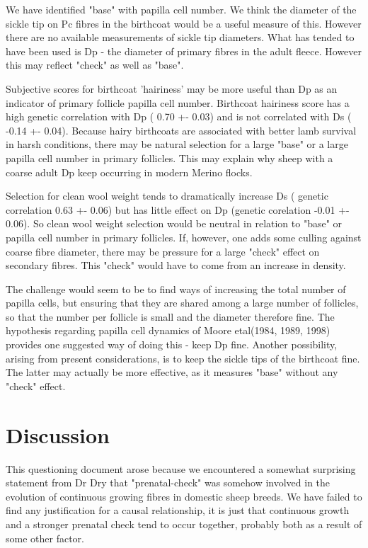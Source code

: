 \documentclass[titlepage]{article}  %
\begin{document}
We have identified "base" with papilla cell number. We think the diameter of the sickle tip on Pc fibres in the birthcoat would be a useful measure of this. However there are no available measurements of sickle tip diameters. What has tended to have been used is Dp - the diameter of primary fibres in the adult fleece. However this may reflect "check" as well as "base". 

Subjective scores for birthcoat 'hairiness' may be more useful than Dp as an indicator of primary follicle papilla cell number. Birthcoat hairiness score has a high genetic correlation with Dp ( 0.70 +- 0.03) and is not correlated with Ds ( -0.14 +- 0.04).  Because hairy birthcoats are associated with better lamb survival in harsh conditions, there may be natural selection for a large "base" or a large papilla cell number in primary follicles. This may explain why sheep with a coarse adult Dp keep occurring in modern Merino flocks.

Selection for clean wool weight tends to dramatically increase Ds ( genetic correlation 0.63 +- 0.06) but has little effect on Dp (genetic corelation -0.01 +- 0.06).  So clean wool weight selection would be neutral in relation to "base" or papilla cell number in primary follicles. If, however, one adds some culling against coarse fibre diameter, there may be pressure for a large "check" effect on secondary fibres. This "check" would have to come from an increase in density.

The challenge would seem to be to find ways of increasing the total number of papilla cells, but ensuring that they are shared among a large number of follicles, so that the number per follicle is small and the diameter therefore fine. The hypothesis regarding papilla cell dynamics of Moore etal(1984, 1989, 1998)~\cite{moor:84}~\cite{moor:89}~\cite{moor:98} provides one suggested way of doing this - keep Dp fine. Another possibility, arising from present considerations, is to keep the sickle tips of the birthcoat fine. The latter may actually be more effective, as it measures "base" without any "check" effect.

\section{Discussion}
This questioning document arose because we encountered a somewhat surprising statement from Dr Dry that "prenatal-check"  was somehow involved in the evolution of continuous growing fibres in domestic sheep breeds. We have failed to find any justification for a causal relationship, it is just that continuous growth and a stronger prenatal check tend to occur together, probably both as a result of some other factor.
\end{document}
